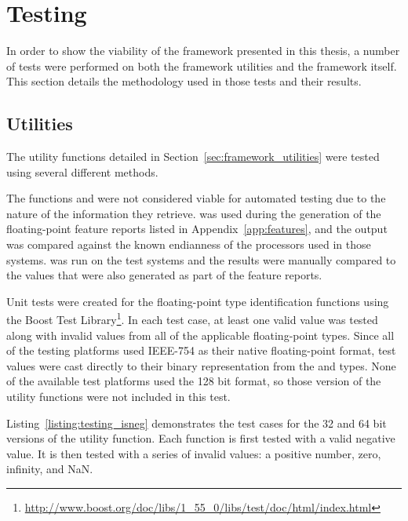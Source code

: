 \chapter{Testing}
\label{chap:testing}
In order to show the viability of the framework presented in this thesis, a number of tests were performed on both the framework utilities and the framework itself. This section details the methodology used in those tests and their results.

\section{Utilities}
\label{sec:testing_utilities}
The utility functions detailed in Section~\ref{sec:framework_utilities} were tested using several different methods.

The functions  and  were not considered viable for automated testing due to the nature of the information they retrieve.  was used during the generation of the floating-point feature reports listed in Appendix~\ref{app:features}, and the output was compared against the known endianness of the processors used in those systems.  was run on the test systems and the results were manually compared to the  values that were also generated as part of the feature reports.

Unit tests were created for the floating-point type identification functions using the Boost Test Library\footnote{\url{http://www.boost.org/doc/libs/1_55_0/libs/test/doc/html/index.html}}. In each test case, at least one valid value was tested along with invalid values from all of the applicable floating-point types. Since all of the testing platforms used IEEE-754 as their native floating-point format, test values were cast directly to their binary representation from the  and  types. None of the available test platforms used the 128 bit  format, so those version of the utility functions were not included in this test.

Listing~\ref{listing:testing_isneg} demonstrates the test cases for the 32 and 64 bit versions of the  utility function. Each function is first tested with a valid negative value. It is then tested with a series of invalid values: a positive number, zero, infinity, and NaN.

